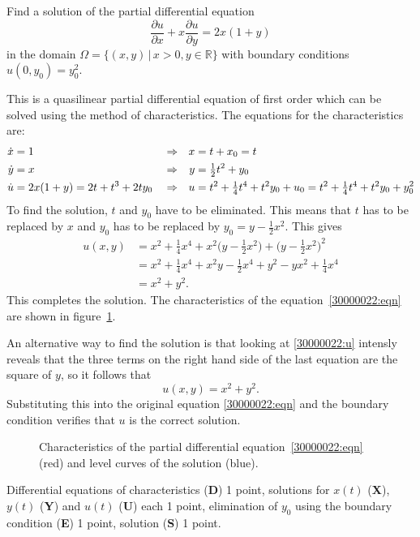 Find a solution of the partial differential equation
\begin{equation}
\frac{\partial u}{\partial x} + x\frac{\partial u}{\partial y}
=
2x(1+y)
\label{30000022:eqn}
\end{equation}
in the domain $\Omega = \{(x,y)\,|\, x >0,y\in\mathbb{R}\}$
with boundary conditions
$u(0,y_0) = y_0^2$.

\begin{loesung}
This is a quasilinear partial differential equation of first order which
can be solved using the method of characteristics.
The equations for the characteristics are:
\begin{align}
\dot{x} &= 1&&\Rightarrow&  x &= t + x_0 = t
\notag
\\
\dot{y} &= x&&\Rightarrow&  y &= {\textstyle\frac12}t^2+y_0
\notag
\\
\dot{u} &= 2x(1+y) = 2t+t^3+2ty_0
&&\Rightarrow& u &= t^2 + {\textstyle\frac14}t^4 + t^2y_0 + u_0
=
t^2+{\textstyle\frac14}t^4+t^2y_0 + y_0^2
\label{30000022:u}
\end{align}
To find the solution, $t$ and $y_0$ have to be eliminated.
This means that $t$ has to be replaced by $x$ and $y_0$ has to be
replaced by $y_0=y-\frac12x^2$.
This gives
\begin{align*}
u(x,y)
&=
x^2+{\textstyle\frac14}x^4
+x^2\bigl(y-{\textstyle\frac12}x^2\bigr)
+ \bigl(y-{\textstyle\frac12}x^2\bigr)^2
\\
&=
x^2+{\textstyle\frac14}x^4
+
x^2y
-{\textstyle\frac12}x^4
+y^2-yx^2+{\textstyle\frac14}x^4
\\
&=x^2+y^2.
\end{align*}
This completes the solution.
The characteristics of the equation~\eqref{30000022:eqn} are shown
in figure~\ref{30000022:graph}.

An alternative way to find the solution is that looking at
\eqref{30000022:u} intensly reveals that the three terms on
the right hand side of the last equation are the square of $y$,
so it follows that
\[
u(x,y) = x^2+y^2.
\]
Substituting this into the original equation \eqref{30000022:eqn}
and the boundary condition verifies that $u$ is the correct solution.
\begin{figure}
\centering
{}
\caption{Characteristics of the partial differential
equation~\eqref{30000022:eqn} (red) and level curves of the solution
(blue).
\label{30000022:graph}}
\end{figure}
\end{loesung}

\begin{bewertung}
Differential equations of characteristics ({\bf D}) 1 point,
solutions for $x(t)$ ({\bf X}), $y(t)$ ({\bf Y}) and $u(t)$ ({\bf U})
each 1 point,
elimination of $y_0$ using the boundary condition ({\bf E}) 1 point,
solution ({\bf S}) 1 point.
\end{bewertung}
